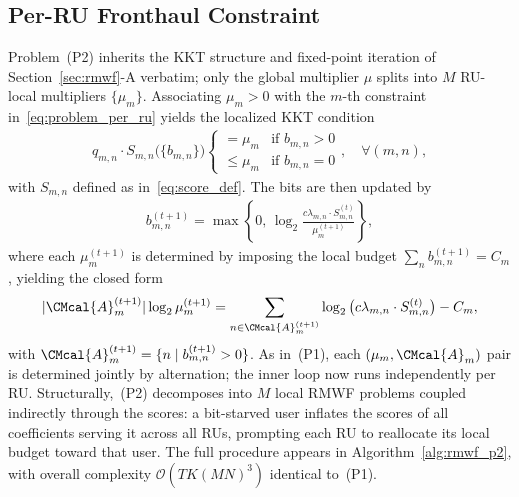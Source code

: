 \documentclass[10pt, twocolumn, comsoc]{IEEEtran}
\newtheorem{remark}{Remark}
\begin{document}
\subsection{Per-RU Fronthaul Constraint}



Problem~(P2) inherits the KKT structure and fixed-point iteration of
Section~\ref{sec:rmwf}-A verbatim; only the global multiplier $\mu$
splits into $M$ RU-local multipliers $\{\mu_m\}$. Associating $\mu_m > 0$ with the $m$-th constraint in~\eqref{eq:problem_per_ru} yields the
localized KKT condition
\begin{align} \label{eq:kkt_p2_exact}
  q_{m,n} \cdot S_{m,n}\big(\{b_{m,n}\}\big)
  \begin{cases}
       = \mu_m & \text{if } b_{m,n} > 0 \\
       \leq \mu_m & \text{if } b_{m,n} = 0
  \end{cases},
  \quad \forall (m, n),
\end{align}
with $S_{m,n}$ defined as in~\eqref{eq:score_def}. The bits are then
updated by
\begin{align} \label{eq:bit_update_p2}
  b_{m,n}^{(t+1)} = \max \left\{0,\,
    \log_2 \frac{c\lambda_{m,n} \cdot S_{m,n}^{(t)}}
                {\mu_m^{(t+1)}}\right\},
\end{align}
where each $\mu_m^{(t+1)}$ is determined by imposing the local budget
$\sum_n b_{m,n}^{(t+1)} = C_m$, yielding the closed form
\begin{align} \label{eq:mu_closed_p2}
  |\CMcal{A}_m^{(t+1)}| \log_2 \mu_m^{(t+1)}
  = \sum_{n \in \CMcal{A}_m^{(t+1)}}
    \log_2 \big(c\lambda_{m,n} \cdot S_{m,n}^{(t)}\big) - C_m,
\end{align}
with $\CMcal{A}_m^{(t+1)}=\{n\mid b_{m,n}^{(t+1)}>0\}$. As in~(P1),
each $(\mu_m, \CMcal{A}_m)$ pair is determined jointly by alternation;
the inner loop now runs independently per RU. Structurally,~(P2) decomposes into $M$ local RMWF problems coupled indirectly through the scores: a bit-starved user inflates the scores of all coefficients serving it across all RUs, prompting each RU to reallocate its local budget toward that user. The full procedure appears in Algorithm~\ref{alg:rmwf_p2}, with overall complexity $\mathcal{O}(TK(MN)^3)$ identical to~(P1).

\end{document}
